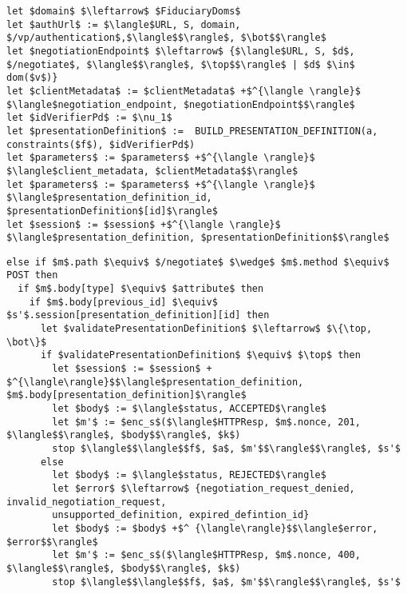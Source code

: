 
\begin{lstlisting}[language=pseudo, caption={Modificação 1 na relação de um verificador $R^{v}$: Processamento de Requisições HTTPS}, firstnumber=21, label={lst:verifier-relation}]
let $domain$ $\leftarrow$ $FiduciaryDoms$
let $authUrl$ := $\langle$URL, S, domain, $/vp/authentication$,$\langle$$\rangle$, $\bot$$\rangle$ 
let $negotiationEndpoint$ $\leftarrow$ {$\langle$URL, S, $d$, $/negotiate$, $\langle$$\rangle$, $\top$$\rangle$ | $d$ $\in$ dom($v$)}
let $clientMetadata$ := $clientMetadata$ +$^{\langle \rangle}$ $\langle$negotiation_endpoint, $negotiationEndpoint$$\rangle$
let $idVerifierPd$ := $\nu_1$
let $presentationDefinition$ :=  BUILD_PRESENTATION_DEFINITION(a, constraints($f$), $idVerifierPd$) 
let $parameters$ := $parameters$ +$^{\langle \rangle}$ $\langle$client_metadata, $clientMetadata$$\rangle$ 
let $parameters$ := $parameters$ +$^{\langle \rangle}$ $\langle$presentation_definition_id, $presentationDefinition$[id]$\rangle$ 
let $session$ := $session$ +$^{\langle \rangle}$ $\langle$presentation_definition, $presentationDefinition$$\rangle$
\end{lstlisting}

\begin{lstlisting}[language=pseudo, caption={Modificação 2 na relação de um verificador $R^{v}$: Processamento de Requisições HTTPS}, firstnumber=101, label={lst:verifier-relation-2}]
else if $m$.path $\equiv$ $/negotiate$ $\wedge$ $m$.method $\equiv$ POST then
  if $m$.body[type] $\equiv$ $attribute$ then
    if $m$.body[previous_id] $\equiv$ $s'$.session[presentation_definition][id] then
      let $validatePresentationDefinition$ $\leftarrow$ $\{\top, \bot\}$
      if $validatePresentationDefinition$ $\equiv$ $\top$ then
        let $session$ := $session$ + $^{\langle\rangle}$$\langle$presentation_definition, $m$.body[presentation_definition]$\rangle$
        let $body$ := $\langle$status, ACCEPTED$\rangle$
        let $m'$ := $enc_s$($\langle$HTTPResp, $m$.nonce, 201, $\langle$$\rangle$, $body$$\rangle$, $k$)
        stop $\langle$$\langle$$f$, $a$, $m'$$\rangle$$\rangle$, $s'$
      else
        let $body$ := $\langle$status, REJECTED$\rangle$
        let $error$ $\leftarrow$ {negotiation_request_denied, invalid_negotiation_request, 
        unsupported_definition, expired_defintion_id} 
        let $body$ := $body$ +$^ {\langle\rangle}$$\langle$error, $error$$\rangle$
        let $m'$ := $enc_s$($\langle$HTTPResp, $m$.nonce, 400, $\langle$$\rangle$, $body$$\rangle$, $k$)
        stop $\langle$$\langle$$f$, $a$, $m'$$\rangle$$\rangle$, $s'$      
\end{lstlisting}